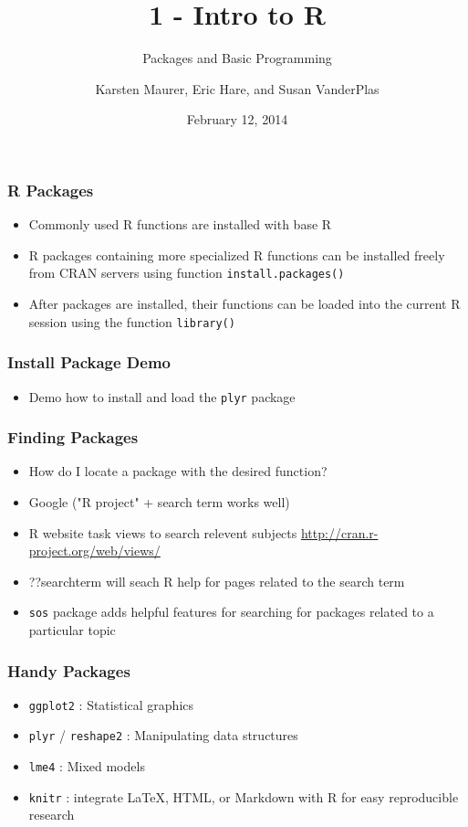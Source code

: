 \documentclass[10pt]{beamer}\usepackage[]{graphicx}\usepackage[]{color}
\title[ 1-Intro]{1 - Intro to R}
\subtitle{Packages and Basic Programming}
\author[ K. Maurer, S. VanderPlas, E. Hare]{Karsten Maurer, Eric Hare, and Susan VanderPlas}
\date{February 12, 2014}
\institute[ISU]{Iowa State University}
\begin{document}
\begin{frame}
    \maketitle
\end{frame}


\begin{frame}
    \frametitle{R Packages}
    \begin{itemize}
        \item Commonly used R functions are installed with base R
        \item R packages containing more specialized R functions can be installed freely from CRAN servers using function \texttt{install.packages()}
        \item After packages are installed, their functions can be loaded into the current R session using the function \texttt{library()}
    \end{itemize}    
\end{frame}


\begin{frame}
    \frametitle{Install Package Demo}
    \begin{itemize}
        \item Demo how to install and load the \texttt{plyr} package
    \end{itemize}
\end{frame}


\begin{frame}
    \frametitle{Finding Packages}
    \begin{itemize}
        \item How do I locate a package with the desired function?
        \item Google ("R project" + search term works well)
        \item R website task views to search relevent subjects  \url{http://cran.r-project.org/web/views/}
        \item ??searchterm will seach R help for pages related to the search term
        \item \texttt{sos} package adds helpful features for searching for packages related to a particular topic
  \end{itemize}
\end{frame}


                                             

\begin{frame}
    \frametitle{Handy Packages}
    \begin{itemize}
        \item \texttt{ggplot2} : Statistical graphics
        \item \texttt{plyr} / \texttt{reshape2} : Manipulating data structures
        \item \texttt{lme4} : Mixed models
        \item \texttt{knitr} : integrate LaTeX, HTML, or Markdown with R for easy reproducible research
  \end{itemize}
\end{frame}
\end{document}
